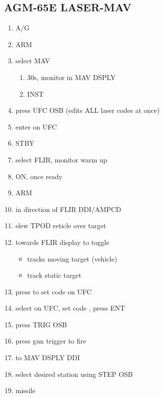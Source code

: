 \documentclass[fontInter]{TechCheck}
\begin{document}
	\subsection{AGM-65E LASER-MAV}
	\begin{enumerate}
		\item {}\dotfill A/G
		\item {}\dotfill ARM
		\item {}\dotfill select MAV
		\begin{enumerate}
			\item {}\dotfill 30s, monitor in MAV DSPLY
			\item {}\dotfill INST
		\end{enumerate}
		\item {}\dotfill press UFC OSB (edits ALL laser codes at once)
		\item {}\dotfill enter on UFC
		\item {}\dotfill STBY
		\item {}\dotfill select FLIR, monitor warm up
		\item {}\dotfill ON, once ready
		\item {}\dotfill ARM
		\item {}\dotfill in direction of FLIR DDI/AMPCD
		\item {}\dotfill slew TPOD reticle over target
		\item {}\dotfill towards FLIR display to toggle
		\begin{itemize}
			\item {} tracks moving target (vehicle)
			\item {} track static target
		\end{itemize}
	\item {}\dotfill press to set code on UFC
	\item {}\dotfill select on UFC, set code , press ENT
	\item {}\dotfill press TRIG OSB
	\item {}\dotfill press gun trigger to fire
	\item {}\dotfill to MAV DSPLY DDI
	\item {}\dotfill select desired station using STEP OSB
	\item {}\dotfill missile
	\end{enumerate}
	
\end{document}
